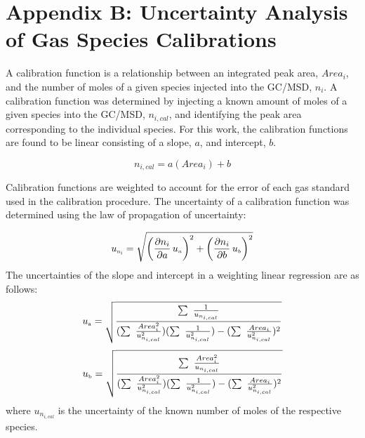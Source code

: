 \documentclass[12pt]{article}
\begin{document}
\pagebreak

\section{Appendix B: Uncertainty Analysis of Gas Species Calibrations}\label{sec:Uncertainty Analysis of Gas Species Calibrations}

A calibration function is a relationship between an integrated peak area, $Area_{i}$, and the number of moles of a given species injected into the GC/MSD, $n_{i}$. A calibration function was determined by injecting a known amount of moles of a given species into the GC/MSD, $n_{i,cal}$, and identifying the peak area corresponding to the individual species. For this work, the calibration functions are found to be linear consisting of a slope, $a$, and intercept, $b$.

\begin{equation}
\label{eq:Calibration Curve}
n_{i,cal} = a(Area_{i})+b
\end{equation}

Calibration functions are weighted to account for the error of each gas standard used in the calibration procedure. The uncertainty of a calibration function was determined using the law of propagation of uncertainty:

\begin{equation}
\label{eq:Given_Moles_Uncertainty}
 u_{\rm \scriptscriptstyle n_{i}} = \sqrt{{\left( \frac{\partial n_{i}}{\partial a}\,u_{\scriptscriptstyle a} \right)}^2+{\left(\frac{\partial {n_{i}}}{\partial b}\,u_{\scriptscriptstyle b}\right)}^2}
\end{equation}
The uncertainties of the slope and intercept in a weighting linear regression are as follows:
\begin{equation}
\label{eq:Slope_Uncertainty}
u_{\rm \scriptscriptstyle a} =\sqrt{\frac{\sum~\frac{1}{u_{n_{i,cal}}}}{(\sum~\frac{Area_{i}^2}{{u_{n_{i,cal}}^2}})(\sum~\frac{1}{{u_{n_{i,cal}}^2}})-(\sum~\frac{Area_{i}}{{u_{n_{i,cal}}^2}})^2}}
\end{equation}
\begin{equation}
\label{eq:Intercept_Uncertainty}
u_{\rm \scriptscriptstyle b} =\sqrt{\frac{\sum~\frac{Area_{i}^2}{u_{n_{i,cal}}}}{(\sum~\frac{Area_{i}^2}{{u_{n_{i,cal}}^2}})(\sum~\frac{1}{{u_{n_{i,cal}}^2}})-(\sum~\frac{Area_{i}}{{u_{n_{i,cal}}^2}})^2}}
\end{equation}
where $u_{n_{i,cal}}$ is the uncertainty of the known number of moles of the respective species.
\end{document}
